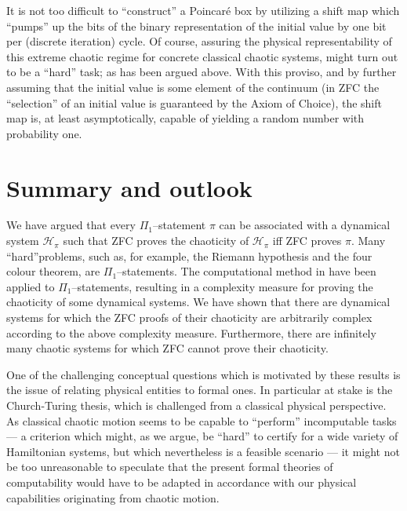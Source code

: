 \documentclass[
aip,
cha,
amssymb
]{revtex4-1}
\begin{document}
It is not too difficult to ``construct'' a Poincar\'e box by utilizing a shift map which ``pumps'' up
the bits of the binary representation of the initial value by one bit per (discrete iteration) cycle.
Of course, assuring the physical representability of this extreme chaotic regime for concrete
classical chaotic systems, might turn out to be a ``hard'' task; as has been argued above.
With this proviso, and by further assuming that the initial value is some element of the continuum
(in ZFC the ``selection'' of an initial value is guaranteed by the Axiom of Choice), the shift map
is, at least asymptotically, capable of yielding a random number with probability one.


\section{Summary and outlook}

We have argued that every $\Pi_{1}$--statement $\pi$ can be associated with a dynamical system $\mathcal{H}_{\pi}$ such that
ZFC proves the chaoticity of $\mathcal{H}_{\pi}$ iff ZFC proves $\pi$.
Many ``hard''problems, such as, for example, the Riemann hypothesis and the four colour theorem, are  $\Pi_{1}$--statements.
The computational method  in  \cite{calude-elena-dinneen06,calude-elena-ec1,calude-elena-ec2}  have been applied to
$\Pi_{1}$--statements, resulting in a complexity measure for proving the chaoticity of some dynamical systems.
We have shown that there are dynamical systems for which the ZFC proofs of their chaoticity are
arbitrarily complex according to the above complexity measure.
Furthermore, there are infinitely
many chaotic systems for which ZFC cannot prove their chaoticity.

One of the challenging conceptual questions which is motivated by these results is the issue of relating physical entities to formal ones.
In particular at stake is the Church-Turing thesis, which is challenged from a classical physical perspective.
As classical chaotic motion seems to be capable to ``perform'' incomputable tasks --- a criterion which might,
as we argue, be ``hard'' to certify for a wide variety of Hamiltonian systems, but which nevertheless is a feasible scenario  ---
it might not be too unreasonable to speculate that
the present formal theories of computability would have to be adapted in accordance with our physical capabilities originating
from chaotic motion.




\end{document}
